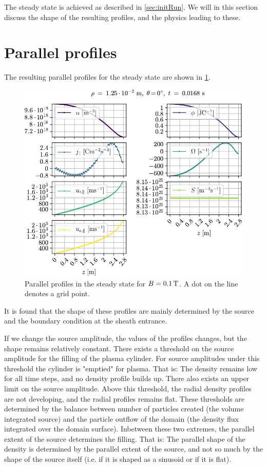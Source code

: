 The steady state is achieved as described in \cref{sec:initRun}.
We will in this section discuss the shape of the resulting profiles, and the physics leading to these.

\section{Parallel profiles}
\label{sec:parProf}
%
The resulting parallel profiles for the steady state are shown in \cref{fig:parProfs}.
%
\begin{figure}[htb]
    \centering
    \includegraphics{fig/results/1DProfiles/B010Par}
    \caption{Parallel profiles in the steady state for $B=0.1\, \text{T}$.
        A dot on the line denotes a grid point.}
    \label{fig:parProfs}
\end{figure}
%
It is found that the shape of these profiles are mainly determined by the source and the boundary condition at the sheath entrance.

If we change the source amplitude, the values of the profiles changes, but the shape remains relatively constant.
There exists a threshold on the source amplitude for the filling of the plasma cylinder.
For source amplitudes under this threshold the cylinder is "emptied" for plasma.
That is: The density remains low for all time steps, and no density profile builds up.
There also exists an upper limit on the source amplitude.
Above this threshold, the radial density profiles are not developing, and the radial profiles remains flat.
These thresholds are determined by the balance between number of particles created (the volume integrated source) and the particle outflow of the domain (the density flux integrated over the domain surface).
Inbetween these two extremes, the parallel extent of the source determines the filling.
That is: The parallel shape of the density is determined by the parallel extent of the source, and not so much by the shape of the source itself (i.e. if it is shaped as a sinusoid or if it is flat).

